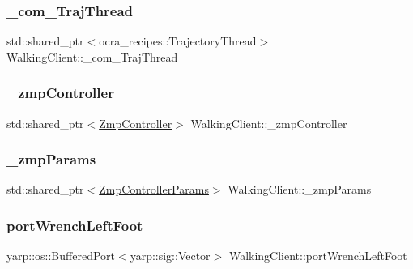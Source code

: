 \subsubsection{\texorpdfstring{\+\_\+com\+\_\+\+Traj\+Thread}{\_com\_TrajThread}}
{\footnotesize\ttfamily std\+::shared\+\_\+ptr$<$ocra\+\_\+recipes\+::\+Trajectory\+Thread$>$ Walking\+Client\+::\+\_\+com\+\_\+\+Traj\+Thread\hspace{0.3cm}{\ttfamily [private]}}

\hypertarget{classWalkingClient_afc6a0ac97a4c3f83e27879e803fab8f6}{}\label{classWalkingClient_afc6a0ac97a4c3f83e27879e803fab8f6} 
\subsubsection{\texorpdfstring{\+\_\+zmp\+Controller}{\_zmpController}}
{\footnotesize\ttfamily std\+::shared\+\_\+ptr$<$\hyperlink{classZmpController}{Zmp\+Controller}$>$ Walking\+Client\+::\+\_\+zmp\+Controller\hspace{0.3cm}{\ttfamily [private]}}

\hypertarget{classWalkingClient_a20012b4bee7f6de8177ed53907f894cb}{}\label{classWalkingClient_a20012b4bee7f6de8177ed53907f894cb} 
\subsubsection{\texorpdfstring{\+\_\+zmp\+Params}{\_zmpParams}}
{\footnotesize\ttfamily std\+::shared\+\_\+ptr$<$\hyperlink{structZmpControllerParams}{Zmp\+Controller\+Params}$>$ Walking\+Client\+::\+\_\+zmp\+Params\hspace{0.3cm}{\ttfamily [private]}}

\hypertarget{classWalkingClient_a88ee63ff6a341eccd458d24700383457}{}\label{classWalkingClient_a88ee63ff6a341eccd458d24700383457} 
\subsubsection{\texorpdfstring{port\+Wrench\+Left\+Foot}{portWrenchLeftFoot}}
{\footnotesize\ttfamily yarp\+::os\+::\+Buffered\+Port$<$yarp\+::sig\+::\+Vector$>$ Walking\+Client\+::port\+Wrench\+Left\+Foot}

